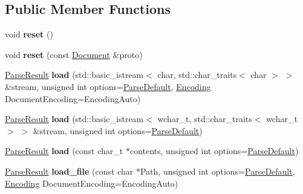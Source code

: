 \subsection*{Public Member Functions}
\begin{DoxyCompactItemize}
\item 
\hypertarget{classphys_1_1xml_1_1Document_aadb3e68da9cf95b1193f915136f9a7e5}{
void {\bfseries reset} ()}
\label{dd/d44/classphys_1_1xml_1_1Document_aadb3e68da9cf95b1193f915136f9a7e5}

\item 
\hypertarget{classphys_1_1xml_1_1Document_a8d79b0e71457e8a64f331fd4cc117a86}{
void {\bfseries reset} (const \hyperlink{classphys_1_1xml_1_1Document}{Document} \&proto)}
\label{dd/d44/classphys_1_1xml_1_1Document_a8d79b0e71457e8a64f331fd4cc117a86}

\item 
\hypertarget{classphys_1_1xml_1_1Document_a481bb17790901c270163dc1b7f4824e8}{
\hyperlink{structphys_1_1xml_1_1ParseResult}{ParseResult} {\bfseries load} (std::basic\_\-istream$<$ char, std::char\_\-traits$<$ char $>$ $>$ \&stream, unsigned int options=\hyperlink{namespacephys_1_1xml_aa6b8f7f8c2322fd683a235b498834d60}{ParseDefault}, \hyperlink{namespacephys_1_1xml_a420f5de782438f88160321385bea2015}{Encoding} DocumentEncoding=EncodingAuto)}
\label{dd/d44/classphys_1_1xml_1_1Document_a481bb17790901c270163dc1b7f4824e8}

\item 
\hypertarget{classphys_1_1xml_1_1Document_acb57d77f011b7544475c7a799f6f7f10}{
\hyperlink{structphys_1_1xml_1_1ParseResult}{ParseResult} {\bfseries load} (std::basic\_\-istream$<$ wchar\_\-t, std::char\_\-traits$<$ wchar\_\-t $>$ $>$ \&stream, unsigned int options=\hyperlink{namespacephys_1_1xml_aa6b8f7f8c2322fd683a235b498834d60}{ParseDefault})}
\label{dd/d44/classphys_1_1xml_1_1Document_acb57d77f011b7544475c7a799f6f7f10}

\item 
\hypertarget{classphys_1_1xml_1_1Document_a6a0f671943e92d5a341ddabee3f80b5d}{
\hyperlink{structphys_1_1xml_1_1ParseResult}{ParseResult} {\bfseries load} (const char\_\-t $\ast$contents, unsigned int options=\hyperlink{namespacephys_1_1xml_aa6b8f7f8c2322fd683a235b498834d60}{ParseDefault})}
\label{dd/d44/classphys_1_1xml_1_1Document_a6a0f671943e92d5a341ddabee3f80b5d}

\item 
\hypertarget{classphys_1_1xml_1_1Document_a1478bde859218b917ef249e9296b55a5}{
\hyperlink{structphys_1_1xml_1_1ParseResult}{ParseResult} {\bfseries load\_\-file} (const char $\ast$Path, unsigned int options=\hyperlink{namespacephys_1_1xml_aa6b8f7f8c2322fd683a235b498834d60}{ParseDefault}, \hyperlink{namespacephys_1_1xml_a420f5de782438f88160321385bea2015}{Encoding} DocumentEncoding=EncodingAuto)}
\label{dd/d44/classphys_1_1xml_1_1Document_a1478bde859218b917ef249e9296b55a5}


\end{DoxyCompactItemize}
